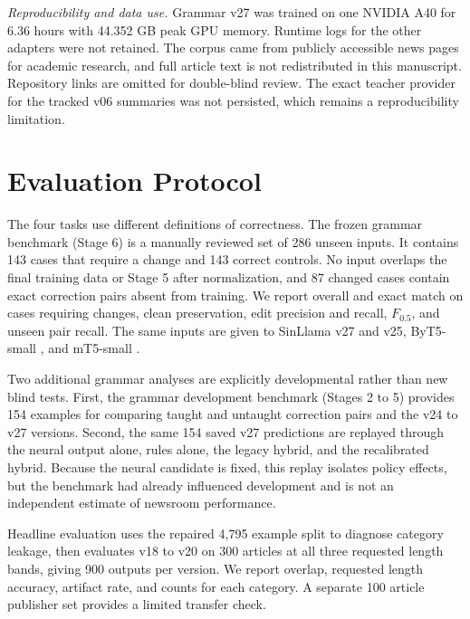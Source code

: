\documentclass[a4paper,conference]{IEEEtran}
\begin{document}
\textit{Reproducibility and data use.} Grammar v27 was trained on one NVIDIA
A40 for 6.36 hours with 44.352 GB peak GPU memory. Runtime logs for the other
adapters were not retained. The corpus came from publicly accessible news pages
for academic research, and full article text is not redistributed in this
manuscript. Repository links are omitted for double-blind review. The exact
teacher provider for the tracked v06 summaries was not persisted, which remains
a reproducibility limitation.

\section{Evaluation Protocol}
The four tasks use different definitions of correctness. The frozen grammar benchmark (Stage 6) is a
manually reviewed set of 286 unseen inputs. It contains
143 cases that require a change and 143 correct controls. No input overlaps the
final training data or Stage 5 after normalization, and 87 changed cases contain
exact correction pairs absent from training. We report overall and
exact match on cases requiring changes, clean preservation, edit precision and recall,
$F_{0.5}$, and unseen pair recall. The same inputs are given to SinLlama v27 and
v25, ByT5-small \cite{xue2022byt5}, and mT5-small \cite{xue2021mt5}.

Two additional grammar analyses are explicitly developmental rather than new
blind tests. First, the grammar development benchmark (Stages 2 to 5) provides 154 examples
for comparing taught and untaught correction pairs and the v24 to v27 versions. Second, the
same 154 saved v27 predictions are replayed through the neural output alone, rules alone, the
legacy hybrid, and the recalibrated hybrid. Because the neural
candidate is fixed, this replay isolates policy effects, but the benchmark had
already influenced development and is not an independent estimate of newsroom
performance.

Headline evaluation uses the repaired 4,795 example split to diagnose category
leakage, then evaluates v18 to v20 on 300 articles at all three requested length
bands, giving 900 outputs per version. We report overlap, requested length
accuracy, artifact rate, and counts for each category. A separate 100 article
publisher set provides a limited transfer check.
\end{document}

